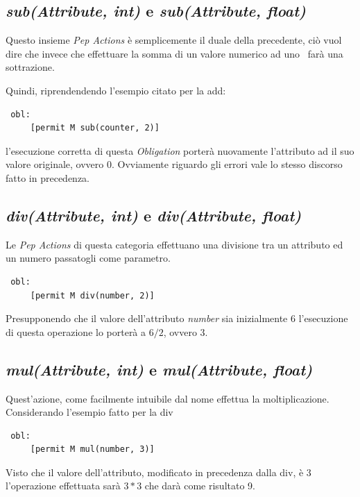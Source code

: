 \subsection*{\textit{sub(Attribute, int)} e \textit{sub(Attribute, float)}} %
\label{ssub:opsub}
Questo insieme \textit{Pep Actions} è semplicemente il duale della precedente, ciò vuol dire che invece che effettuare la somma di un valore numerico ad uno \statusattribute \ farà una sottrazione.\\ \par
Quindi, riprendendendo l'esempio citato per la add:
\begin{verbatim}
 obl:
     [permit M sub(counter, 2)]
\end{verbatim}
l'esecuzione corretta di questa \textit{Obligation} porterà nuovamente l'attributo ad il suo valore originale, ovvero $0$. Ovviamente riguardo gli errori vale lo stesso discorso fatto in precedenza.

\subsection*{\textit{div(Attribute, int)} e \textit{div(Attribute, float)}} %
\label{ssub:opdiv}
Le \textit{Pep Actions} di questa categoria effettuano una divisione tra un attributo ed un numero passatogli come parametro.
\begin{verbatim}
 obl:
     [permit M div(number, 2)]
\end{verbatim}
Presupponendo che il valore dell'attributo \textit{number} sia inizialmente 6 l'esecuzione di questa operazione lo porterà a $6/2$, ovvero 3.

\subsection*{\textit{mul(Attribute, int)} e \textit{mul(Attribute, float)}} %
\label{ssub:opdiv}
Quest'azione, come facilmente intuibile dal nome effettua la moltiplicazione.
Considerando l'esempio fatto per la div
\begin{verbatim}
 obl:
     [permit M mul(number, 3)]
\end{verbatim}
Visto che il valore dell'attributo, modificato in precedenza dalla div, è 3 l'operazione effettuata sarà $3*3$ che darà come risultato 9.



